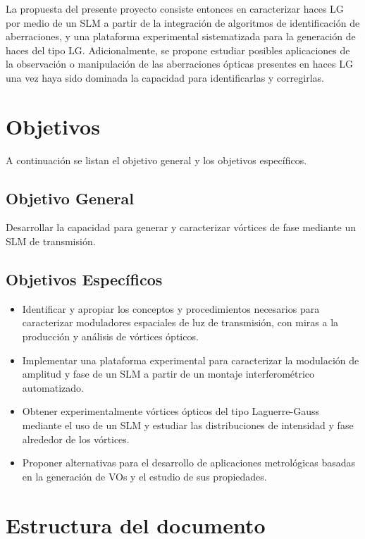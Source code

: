 La propuesta del presente proyecto consiste entonces en caracterizar
haces LG por medio de un SLM a partir de la integración de  
algoritmos de identificación de aberraciones, y una plataforma
experimental sistematizada para la generación de haces del tipo LG.  
Adicionalmente, se propone estudiar posibles aplicaciones de la
observación o manipulación de las aberraciones ópticas presentes en
haces LG una vez haya sido dominada la capacidad para identificarlas y
corregirlas. 


\section{Objetivos}
\label{sec:objetivos}
 A continuación se listan el objetivo general y los
objetivos específicos. 
\subsection{Objetivo General}
Desarrollar la capacidad para generar y caracterizar vórtices de fase
mediante un SLM de transmisión.
\subsection{Objetivos Específicos}
\begin{itemize}
\item Identificar y apropiar los conceptos y procedimientos necesarios
  para caracterizar moduladores espaciales de luz de transmisión, con
  miras a la producción y análisis de vórtices ópticos.
\item Implementar una plataforma experimental para caracterizar la
  modulación de amplitud y fase de un SLM a partir de un montaje
  interferométrico automatizado.
\item Obtener experimentalmente vórtices ópticos del tipo
  Laguerre-Gauss mediante el uso de un SLM y estudiar las
  distribuciones de intensidad y fase alrededor de los vórtices.
\item Proponer alternativas para el desarrollo de aplicaciones
  metrológicas basadas en la generación de VOs y el estudio de sus
  propiedades.
\end{itemize}

\section{Estructura del documento\label{sec:estructura}}

